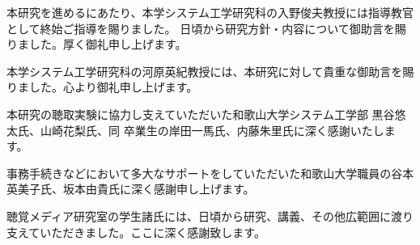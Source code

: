 \documentclass[11pt]{jreport}
\begin{document}
\tableofcontents



\newpage
{}	%





 



\begin{acknowledgements}
本研究を進めるにあたり、本学システム工学研究科の入野俊夫教授には指導教官として終始ご指導を賜りました。
日頃から研究方針・内容について御助言を賜りました。厚く御礼申し上げます。

本学システム工学研究科の河原英紀教授には、本研究に対して貴重な御助言を賜りました。心より御礼申し上げます。

本研究の聴取実験に協力し支えていただいた和歌山大学システム工学部 黒谷悠太氏、山崎花梨氏、同 卒業生の岸田一馬氏、内藤朱里氏に深く感謝いたします。

事務手続きなどにおいて多大なサポートをしていただいた和歌山大学職員の谷本英美子氏、坂本由貴氏に深く感謝申し上げます。

聴覚メディア研究室の学生諸氏には、日頃から研究、講義、その他広範囲に渡り支えていただきました。ここに深く感謝致します。
\end{acknowledgements}




% 




\appendix
\end{document}

